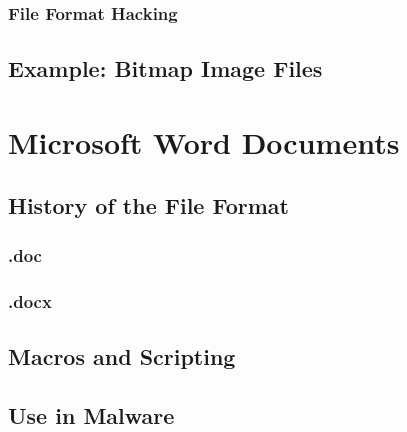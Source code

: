 \subsubsection{File Format Hacking}
\subsection{Example: Bitmap Image Files}

\section{Microsoft Word Documents}
\subsection{History of the File Format}
\subsubsection{.doc}
\subsubsection{.docx}
\subsection{Macros and Scripting}
\subsection{Use in Malware}


\clearpage

